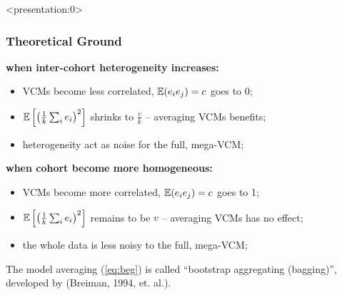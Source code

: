 \documentclass{beamer}
\begin{document}
\begin{frame} <presentation:0>%
  \frametitle{Theoretical Ground}%
  \textbf{when inter-cohort heterogeneity increases:}
  \begin{itemize}
  \item VCMs become less correlated, $\operatorname{\mathbb{E}}(e_i e_j) = c$ goes to 0;
  \item $\operatorname{\mathbb{E}}\left[ \left(\frac{1}{k}\sum_i e_i\right)^2 \right]$
    shrinks to $\frac{v}{k}$ -- averaging VCMs benefits;
  \item heterogeneity act as noise for the full, mega-VCM;
  \end{itemize}
  \textbf{when cohort become more homogeneous:}
  \begin{itemize}
  \item VCMs become more correlated, $\operatorname{\mathbb{E}}(e_i e_j) = c$ goes to 1;
  \item $\operatorname{\mathbb{E}}\left[ \left(\frac{1}{k}\sum_i e_i\right)^2 \right]$
    remains to be $v$ -- averaging VCMs has no effect;
  \item the whole data is less noisy to the full, mega-VCM;
  \end{itemize}
  The model averaging (\ref{eq:beg}) is called ``bootstrap aggregating
  (bagging)'', developed by (Breiman, 1994, et. al.).
\end{frame}
\end{document}
